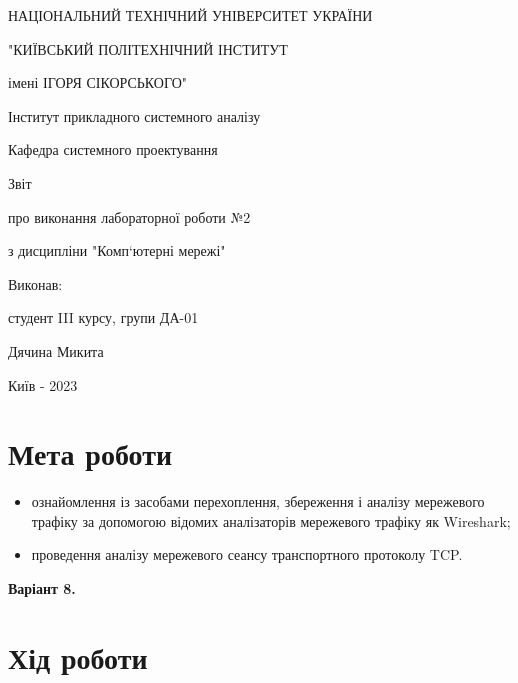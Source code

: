 \documentclass[12 pt, a4paper]{article}
\begin{document}
\large
\onehalfspacing

\thispagestyle{empty}

\begin{center}

    \bfseries

    НАЦІОНАЛЬНИЙ ТЕХНІЧНИЙ УНІВЕРСИТЕТ УКРАЇНИ

    "КИЇВСЬКИЙ ПОЛІТЕХНІЧНИЙ ІНСТИТУТ

    імені  ІГОРЯ  СІКОРСЬКОГО"

    Інститут  прикладного системного аналізу

    Кафедра системного проектування

    \mdseries

    \vfill

    Звіт

    про виконання лабораторної роботи №2

    з дисципліни "Комп‘ютерні мережі"

    \vfill

    \begin{flushleft}

        Виконав:

        студент III курсу, групи ДА-01

        Дячина Микита

    \end{flushleft}

    \vfill

    Київ - 2023

\end{center}

\newpage

\section*{Мета роботи}

\begin{itemize}
    \item ознайомлення із засобами перехоплення, збереження і аналізу мережевого трафіку за допомогою відомих аналізаторів мережевого трафіку як Wireshark;

    \item проведення аналізу мережевого сеансу транспортного протоколу TCP.
\end{itemize}

{\bfseries Варіант 8.}

\section*{Хід роботи}
\end{document}
